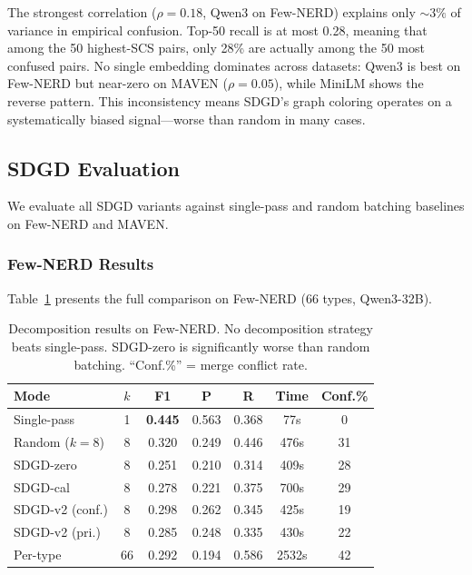 \documentclass[11pt,a4paper]{article}
\begin{document}
The strongest correlation ($\rho{=}0.18$, Qwen3 on Few-NERD) explains only ${\sim}3\%$ of variance in empirical confusion. Top-50 recall is at most 0.28, meaning that among the 50 highest-SCS pairs, only 28\% are actually among the 50 most confused pairs. No single embedding dominates across datasets: Qwen3 is best on Few-NERD but near-zero on MAVEN ($\rho{=}0.05$), while MiniLM shows the reverse pattern. This inconsistency means SDGD's graph coloring operates on a systematically biased signal---worse than random in many cases.

\subsection{SDGD Evaluation}
\label{sec:sdgd}

We evaluate all SDGD variants against single-pass and random batching baselines on Few-NERD and MAVEN.

\subsubsection{Few-NERD Results}

Table~\ref{tab:sdgd_fewnerd} presents the full comparison on Few-NERD (66 types, Qwen3-32B).

\begin{table}[t]
\centering
\small
\begin{tabular}{lcccccc}
\toprule
Mode & $k$ & F1 & P & R & Time & Conf.\% \\
\midrule
Single-pass & 1 & \textbf{0.445} & 0.563 & 0.368 & 77s & 0 \\
Random ($k{=}8$) & 8 & 0.320 & 0.249 & 0.446 & 476s & 31 \\
SDGD-zero & 8 & 0.251 & 0.210 & 0.314 & 409s & 28 \\
SDGD-cal & 8 & 0.278 & 0.221 & 0.375 & 700s & 29 \\
SDGD-v2 (conf.) & 8 & 0.298 & 0.262 & 0.345 & 425s & 19 \\
SDGD-v2 (pri.) & 8 & 0.285 & 0.248 & 0.335 & 430s & 22 \\
Per-type & 66 & 0.292 & 0.194 & 0.586 & 2532s & 42 \\
\bottomrule
\end{tabular}
\caption{Decomposition results on Few-NERD. No decomposition strategy beats single-pass. SDGD-zero is significantly worse than random batching. ``Conf.\%'' = merge conflict rate.}
\label{tab:sdgd_fewnerd}
\end{table}
\end{document}
